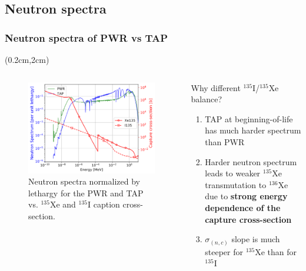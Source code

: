 \subsection{Neutron spectra}

\begin{frame}
\frametitle{Neutron spectra of PWR vs TAP}
\begin{textblock*}{12.3cm}(0.2cm,2cm) %
	\begin{columns}[t,onlytextwidth]
		\begin{figure}[t]
			\includegraphics[width=\linewidth]{./images/spectra.png}
			\caption{Neutron spectra normalized by lethargy for the PWR and 
			TAP vs. $^{135}$Xe and $^{135}$I caption cross-section.}
		\end{figure}
	
	
		\vspace{+1mm}
		\begin{block}{Why different $^{135}$I/$^{135}$Xe balance?}
			\begin{enumerate}             
				\item TAP at beginning-of-life has much harder spectrum than 
				PWR
				\item Harder neutron spectrum leads to weaker $^{135}$Xe 
				transmutation to $^{136}$Xe due to \textbf{strong energy 
				dependence of the capture cross-section}
				\item $\sigma_{(n,c)}$ slope is much steeper  for 
				$^{135}$Xe than for $^{135}$I
			\end{enumerate}
		\end{block}
	\end{columns}
\end{textblock*}
\end{frame}